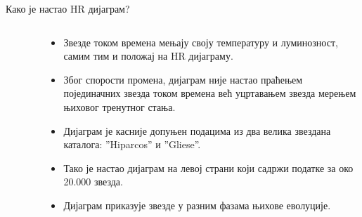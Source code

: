 \documentclass[aspectratio=169, xcolor=table, 10pt]{beamer}
\begin{document}
\begin{frame}{Како је настао HR дијаграм?}
  \begin{columns}[T]
    \begin{column}{0.4\textwidth}
      \begin{figure}
        \centering
        \vspace{-1em}
      \end{figure}
    \end{column}
    \begin{column}{0.6\textwidth}
      \begin{itemize}
        \item Звезде током времена мењају своју температуру и луминозност, самим тим и положај на HR дијаграму.
        \item Због спорости промена, дијаграм није настао праћењем појединачних звезда током времена већ уцртавањем звезда мерењем њиховог тренутног стања.
        \item Дијаграм је касније допуњен подацима из два велика звездана каталога: ”Hiparcos” и ”Gliese”.
        \item Тако је настао дијаграм на левој страни који садржи податке за око 20.000 звезда.
        \item Дијаграм приказује звезде у разним фазама њихове еволуције.
      \end{itemize}
    \end{column}
  \end{columns}
\end{frame}
\end{document}

